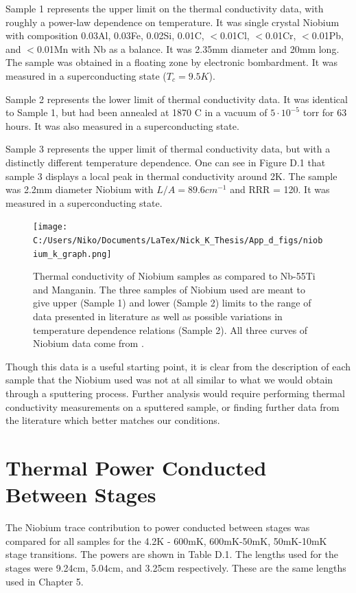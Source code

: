 \documentclass{report}
\begin{document}
\begin{appendices}
Sample 1 represents the upper limit on the thermal conductivity data, with roughly a power-law dependence on temperature. It was single crystal Niobium with composition 0.03Al, 0.03Fe, 0.02Si, 0.01C, $<$0.01Cl, $<$0.01Cr, $<$0.01Pb, and $<$0.01Mn with Nb as a balance. It was 2.35mm diameter and 20mm long. The sample was obtained in a floating zone by electronic bombardment. It was measured in a superconducting state ($T_c = 9.5K$).

Sample 2 represents the lower limit of thermal conductivity data. It was identical to Sample 1, but had been annealed at 1870 C in a vacuum of $5\cdot10^{-5}$ torr for 63 hours. It was also measured in a superconducting state.

Sample 3 represents the upper limit of thermal conductivity data, but with a distinctly different temperature dependence. One can see in Figure D.1 that sample 3 displays a local peak in thermal conductivity around 2K. The sample was 2.2mm diameter Niobium with $L/A = 89.6cm^{-1}$ and RRR = 120. It was measured in a superconducting state.


\begin{figure}[h]
\centering
\texttt{[image: C:/Users/Niko/Documents/LaTex/Nick\_K\_Thesis/App\_d\_figs/niobium\_k\_graph.png]}
\caption{Thermal conductivity of Niobium samples as compared to Nb-55Ti\cite{ols} and Manganin\cite{powell1966}. The three samples of Niobium used are meant to give upper (Sample 1) and lower (Sample 2) limits to the range of data presented in literature as well as possible variations in temperature dependence relations (Sample 2). All three curves of Niobium data come from \cite{tou}.}
\end{figure}

Though this data is a useful starting point, it is clear from the description of each sample that the Niobium used was not at all similar to what we would obtain through a sputtering process. Further analysis would require performing thermal conductivity measurements on a sputtered sample, or finding further data from the literature which better matches our conditions.

\section{Thermal Power Conducted Between Stages}
The Niobium trace contribution to power conducted between stages was compared for all samples for the 4.2K - 600mK, 600mK-50mK, 50mK-10mK stage transitions. The powers are shown in Table D.1. The lengths used for the stages were 9.24cm, 5.04cm, and 3.25cm respectively. These are the same lengths used in Chapter 5.


\end{appendices}
\end{document}

